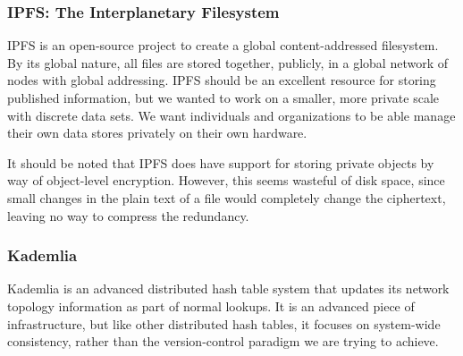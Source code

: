 \documentclass[a4paper]{article}
\begin{document}
\subsubsection{IPFS: The Interplanetary Filesystem}

IPFS \cite{ipfs_github_main} is an open-source project to create a global
content-addressed filesystem. By its global nature, all files are stored
together, publicly, in a global network of nodes with global addressing. IPFS
should be an excellent resource for storing published information, but we wanted
to work on a smaller, more private scale with discrete data sets. We want
individuals and organizations to be able manage their own data stores privately
on their own hardware.

It should be noted that IPFS does have support for storing private objects by
way of object-level encryption. However, this seems wasteful of disk space,
since small changes in the plain text of a file would completely change the
ciphertext, leaving no way to compress the redundancy.


\subsubsection{Kademlia}

Kademlia \cite{Maymounkov2002} is an advanced distributed hash table system that
updates its network topology information as part of normal lookups. It is an
advanced piece of infrastructure, but like other distributed hash tables, it
focuses on system-wide consistency, rather than the version-control paradigm we
are trying to achieve.




\end{document}
